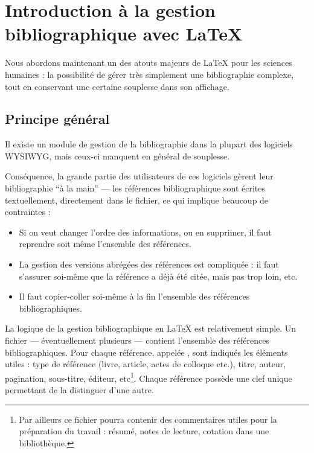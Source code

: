 \chapter[Introduction]{Introduction à la gestion bibliographique avec \LaTeX{}}
\begin{prealable}
Nous abordons maintenant un des atouts majeurs de \LaTeX{} pour les sciences humaines : la possibilité de gérer très simplement une bibliographie complexe, tout en conservant une certaine souplesse dans son affichage.

\end{prealable}
\section{Principe général}



Il existe un module de gestion de la bibliographie dans la plupart des logiciels WYSIWYG, mais ceux-ci manquent en général de souplesse.

Conséquence, la grande partie des utilisateurs de ces logiciels gèrent leur bibliographie \enquote{à la main} --- les références bibliographique sont écrites textuellement, directement dans le fichier, ce qui implique beaucoup de contraintes  :
\begin{itemize}
\item Si on veut changer l'ordre des informations, ou en supprimer, il faut reprendre soit même l'ensemble des références.
\item La gestion des versions abrégées des références est  compliquée :  il faut s'assurer soi-même que la référence a déjà été citée, mais pas trop loin, etc. 
\item Il faut copier-coller soi-même à la fin l'ensemble des références bibliographiques. 
\end{itemize}

La logique de la gestion bibliographique en \LaTeX{} est relativement simple. Un fichier   --- éventuellement plusieurs --- contient l'ensemble des références bibliographiques. Pour chaque référence, appelée , sont indiqués les éléments utiles :  type de référence (livre, article, actes de colloque etc.), titre, auteur, pagination, sous-titre, éditeur, etc\footnote{Par ailleurs ce fichier pourra contenir des commentaires utiles pour la préparation du travail : résumé, notes de lecture, cotation dans une bibliothèque.}. Chaque référence possède une clef unique permettant de la distinguer d'une autre.

